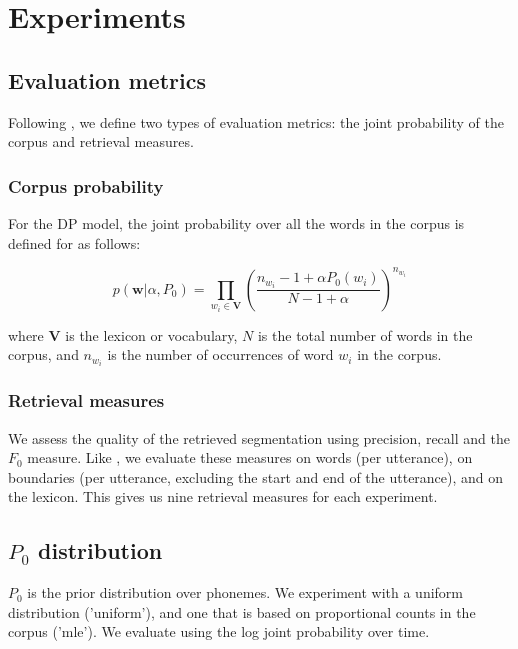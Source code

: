 \section{Experiments}

\subsection{Evaluation metrics}

Following \cite{Goldwater200921}, we define two types of evaluation metrics: the joint probability of the corpus and retrieval measures.

\subsubsection{Corpus probability}

For the DP model, the joint probability over all the words in the corpus is defined for as follows:

\begin{equation}
p(\mathbf{w} | \alpha, P_0) = \prod_{w_i \in \mathbf{V}} \left( \frac{n_{w_i} - 1 + \alpha P_0(w_i)}{N - 1 + \alpha} \right)^{n_{w_i}}
\end{equation}

where $\mathbf{V}$ is the lexicon or vocabulary, $N$ is the total number of words in the corpus, and $n_{w_i}$ is the number of occurrences of word $w_i$ in the corpus.

\subsubsection{Retrieval measures}

We assess the quality of the retrieved segmentation using precision, recall and the $F_0$ measure. Like \cite{Goldwater200921}, we evaluate these measures on words (per utterance), on boundaries (per utterance, excluding the start and end of the utterance), and on the lexicon. This gives us nine retrieval measures for each experiment.

\subsection{$P_0$ distribution}

$P_0$ is the prior distribution over phonemes. We experiment with a uniform distribution ('uniform'), and one that is based on proportional counts in the corpus ('mle'). We evaluate using the log joint probability over time.

